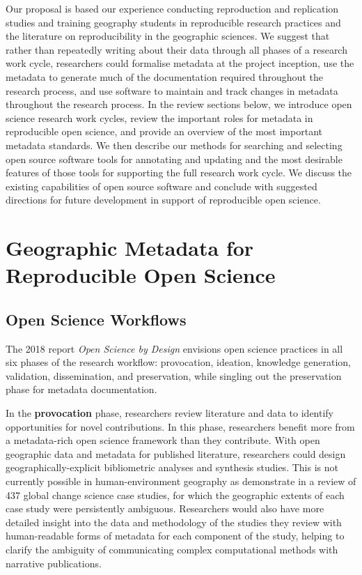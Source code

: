 \documentclass{isprs} %
\begin{document}
Our proposal is based our experience conducting reproduction and replication studies and training geography students in reproducible research practices \citep{Kedron_Holler_Bardin_Hilgendorf_2022} and the literature on reproducibility in the geographic sciences.
We suggest that rather than repeatedly writing about their data through all phases of a research work cycle, researchers could formalise metadata at the project inception, use the metadata to generate much of the documentation required throughout the research process, and use software to maintain and track changes in metadata throughout the research process.
In the review sections below, we introduce open science research work cycles, review the important roles for metadata in reproducible open science, and provide an overview of the most important metadata standards.
We then describe our methods for searching and selecting open source software tools for annotating and updating and the most desirable features of those tools for supporting the full research work cycle.
We discuss the existing capabilities of open source software and conclude with suggested directions for future development in support of reproducible open science.

\section{Geographic Metadata for Reproducible Open Science}\label{sec:Background}

\subsection{Open Science Workflows}\label{sec:Workflow}

The 2018 \citeauthor{NASEM2018} report \textit{Open Science by Design} envisions open science practices in all six phases of the research workflow: provocation, ideation, knowledge generation, validation, dissemination, and preservation, while singling out the preservation phase for metadata documentation.

In the \textbf{provocation} phase, researchers review literature and data to identify opportunities for novel contributions.
In this phase, researchers benefit more from a metadata-rich open science framework than they contribute.
With open geographic data and metadata for published literature, researchers could design geographically-explicit bibliometric analyses and synthesis studies.
This is not currently possible in human-environment geography as \citet{Margulies2016} demonstrate in a review of 437 global change science case studies, for which the geographic extents of each case study were persistently ambiguous. 
Researchers would also have more detailed insight into the data and methodology of the studies they review with human-readable forms of metadata for each component of the study, helping to clarify the ambiguity of communicating complex computational methods with narrative publications.
\end{document}
